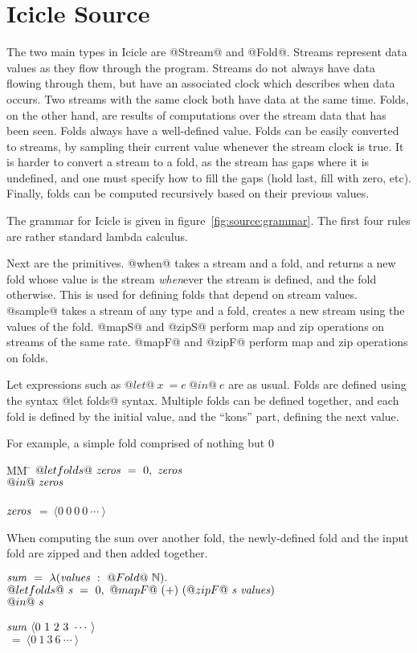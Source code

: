 \section{Icicle Source}
\label{s:Source}

The two main types in Icicle are @Stream@ and @Fold@.
Streams represent data values as they flow through the program.
Streams do not always have data flowing through them, but have an associated clock which describes when data occurs.
Two streams with the same clock both have data at the same time.
Folds, on the other hand, are results of computations over the stream data that has been seen.
Folds always have a well-defined value.
Folds can be easily converted to streams, by sampling their current value whenever the stream clock is true.
It is harder to convert a stream to a fold, as the stream has gaps where it is undefined, and one must specify how to fill the gaps (hold last, fill with zero, etc).
Finally, folds can be computed recursively based on their previous values.


The grammar for Icicle is given in figure~\ref{fig:source:grammar}.
The first four rules are rather standard lambda calculus.

Next are the primitives.
@when@ takes a stream and a fold, and returns a new fold whose value is the stream \emph{when}ever the stream is defined, and the fold otherwise.
This is used for defining folds that depend on stream values.
@sample@ takes a stream of any type and a fold, creates a new stream using the values of the fold.
@mapS@ and @zipS@ perform map and zip operations on streams of the same rate.
@mapF@ and @zipF@ perform map and zip operations on folds.

Let expressions such as $@let@~x~=e~@in@~e$ are as usual. 
Folds are defined using the syntax @let folds@ syntax. 
Multiple folds can be defined together, and each fold is defined by the initial value, and the ``kons'' part, defining the next value.

For example, a simple fold comprised of nothing but $0$
\begin{tabbing}
MM \= \kill
$@let folds@~\mathit{zeros}~=~0,~\mathit{zeros}$ \\
$@in@~\mathit{zeros}$
\\
\\
$\mathit{zeros}$ \> $=~\langle 0~0~0~0~\cdots~\rangle$ \\
\end{tabbing}

When computing the sum over another fold, the newly-defined fold and the input fold are zipped and then added together.
\begin{tabbing}
$\mathit{sum}~=~\lambda{}(\mathit{values}~:~@Fold@~\mathbb{N}).$ \\
$@let folds@~\mathit{s}~=~0,~@mapF@~(+)~(@zipF@~\mathit{s}~\mathit{values})$ \\
$@in@~\mathit{s}$
\\
\\
$\mathit{sum}~\langle 0~1~2~3~\cdots~\rangle$ \\
$~=~\langle 0~1~3~6~\cdots~\rangle$ \\
\end{tabbing}

